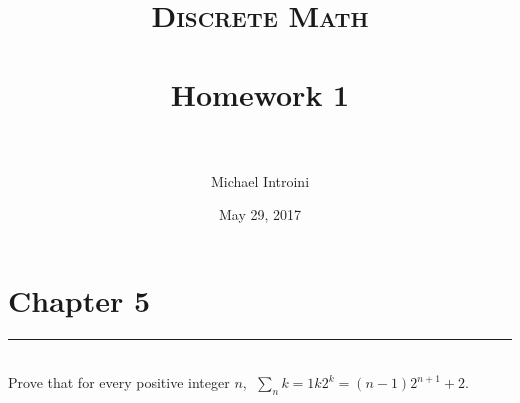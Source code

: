 \documentclass[paper=a4, fontsize=11pt]{scrartcl} %
\title{	
\normalfont \normalsize 
\textsc{Discrete Math} \\ [25pt] %
\horrule{0.5pt} \\[0.2cm] %
\large Homework 1 \\ %
\horrule{2pt} \\[0.2cm] %
}
\author{Michael Introini} %
\date{\normalsize{May 29, 2017}} %
\newcommand{\horrule}[1]{\rule{\linewidth}{#1}} %
\begin{document}
\maketitle %

\section*{Chapter 5}
\horrule{0.5pt} \\ %
Prove that for every positive integer $n$, $\sum_{n}{k=1} k2^k=(n − 1)2^{n+1}+2$.\\
\end{document}
